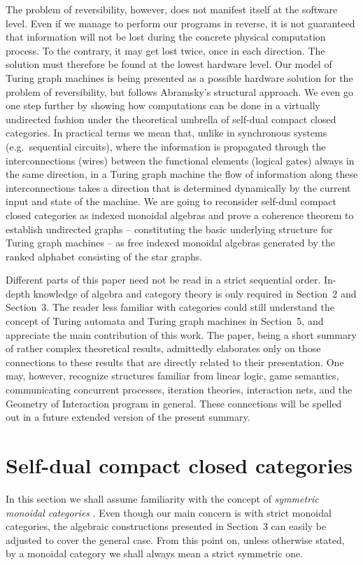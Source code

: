 \documentclass{eptcs}
\begin{document}
The problem of reversibility, however, does not manifest itself at the software
level. Even if we manage to perform our programs in reverse, it is not
guaranteed that information will not be lost during the concrete physical
computation process. To the contrary, it may get lost twice, once in each
direction. The solution must therefore be found at the lowest hardware level.
Our model of Turing graph machines is being presented as a possible hardware
solution for the problem of reversibility, but follows Abramsky's structural
approach. We even go one step further by showing how computations can be done
in a virtually undirected fashion under the theoretical umbrella of self-dual
compact closed categories. In practical terms we mean that, unlike in 
synchronous systems (e.g.\ sequential circuits), where the information is
propagated through the interconnections (wires) between the functional
elements (logical gates) always in the same direction, in a Turing graph
machine the flow of information along these interconnections takes a 
direction that is determined dynamically by the current input and state of the machine.  
We are going to reconsider self-dual compact closed categories as
indexed monoidal algebras and prove a coherence theorem to establish undirected
graphs -- constituting the basic underlying structure for Turing graph machines -- as
free indexed monoidal algebras generated by the ranked alphabet consisting of
the star graphs.

Different parts of this paper need not be read in a strict sequential order. 
In-depth knowledge of algebra and category theory is only required in Section~2
and Section~3. The reader less familiar with categories could still understand
the concept of Turing automata and Turing graph machines in Section~5, and appreciate the 
main contribution of this work. The paper, being a short summary of rather
complex theoretical results, admittedly elaborates only on those
connections to these results that are directly related to their presentation.
One may, however, recognize structures familiar from linear logic,
game semantics, communicating concurrent processes, iteration theories, interaction nets, 
and the Geometry of Interaction program in general. These connections will be spelled
out in a future extended version of the present summary.
\section{Self-dual compact closed categories}
In this section we shall assume familiarity with the concept of {\em
symmetric monoidal categories\/} \cite{mcl}. Even though our main concern is with
strict monoidal categories, the algebraic constructions presented in Section~3
can easily be adjusted to cover the general case. From this point on,
unless otherwise stated, by a monoidal category we shall always mean a strict 
symmetric one. 
\end{document}
